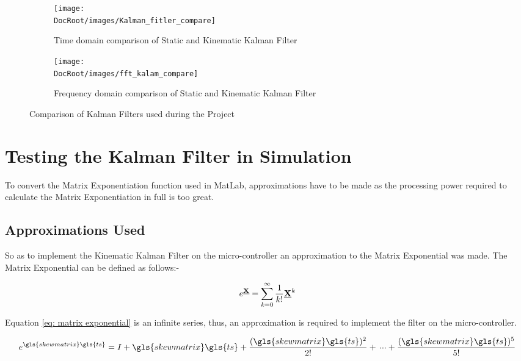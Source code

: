 \begin{figure}[h]
	\centering
	\begin{subfigure}{0.32\textwidth}
		\texttt{[image: \\DocRoot/images/Kalman\_fitler\_compare]}
		\caption{Time domain comparison of Static and Kinematic Kalman Filter}
		\label{fg: Time domain comparison of Static and Kinematic Kalman Filter}
	\end{subfigure}%
	\hspace{3cm}
	\begin{subfigure}{0.32\textwidth}
		\texttt{[image: \\DocRoot/images/fft\_kalam\_compare]}
		\caption{Frequency domain comparison of Static and Kinematic Kalman Filter}
		\label{fg: Frequency domain comparison of Static and Kinematic Kalman Filter}
	\end{subfigure}

\caption{Comparison of Kalman Filters used during the Project}
\label{fig kalman filter comparison}	
\end{figure}

\section{Testing the Kalman Filter in Simulation}
To convert the Matrix Exponentiation function used in MatLab, approximations have to be made as the processing power required to calculate the Matrix Exponentiation in full is too great.

\subsection{Approximations Used}
So as to implement the Kinematic Kalman Filter on the micro-controller an approximation to the Matrix Exponential was made. The Matrix Exponential can be defined as follows:- 

\begin{equation}
e^{\underline{\bf X}} = \sum_{k=0}^{\infty}\frac{1}{k!}{\underline{\bf X}}^k
\label{eq: matrix exponential}
\end{equation}

Equation \ref{eq: matrix exponential} is an infinite series, thus, an approximation is required to implement the filter on the micro-controller.

\begin{equation}
e^{\gls{skewmatrix}\gls{ts}} = I + \gls{skewmatrix}\gls{ts} + \frac{(\gls{skewmatrix}\gls{ts})^2}{2!} + \dddot{}   +\frac{(\gls{skewmatrix}\gls{ts})^5}{5!}  
\end{equation}


